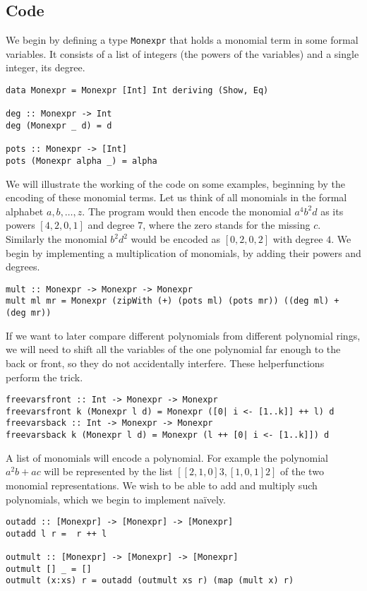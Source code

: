 \subsection*{Code}
We begin by defining a type \texttt{Monexpr} that holds a monomial term in some formal variables.
It consists of a list of integers (the powers of the variables) and a single integer, its degree.
\begin{lstlisting}
data Monexpr = Monexpr [Int] Int deriving (Show, Eq)
 
deg :: Monexpr -> Int
deg (Monexpr _ d) = d

pots :: Monexpr -> [Int]
pots (Monexpr alpha _) = alpha
\end{lstlisting}
We will illustrate the working of the code on some examples, beginning by the encoding of these monomial terms.
Let us think of all monomials in the formal alphabet $a,b,\dots,z$. 
The program would then encode the monomial $a^4b^2d$ as its powers $[4,2,0,1]$ and degree $7$, where the zero stands for the missing $c$. 
Similarly the monomial $b^2 d^2$ would be encoded as $[0,2,0,2]$ with degree $4$.
We begin by implementing a multiplication of monomials, by adding their powers and degrees.
\begin{lstlisting}
mult :: Monexpr -> Monexpr -> Monexpr
mult ml mr = Monexpr (zipWith (+) (pots ml) (pots mr)) ((deg ml) + (deg mr))
\end{lstlisting}
If we want to later compare different polynomials from different polynomial rings, we will need to shift all the variables of the one polynomial far enough to the back or front, so they do not accidentally interfere.
These helperfunctions perform the trick.
\begin{lstlisting}
freevarsfront :: Int -> Monexpr -> Monexpr
freevarsfront k (Monexpr l d) = Monexpr ([0| i <- [1..k]] ++ l) d
freevarsback :: Int -> Monexpr -> Monexpr
freevarsback k (Monexpr l d) = Monexpr (l ++ [0| i <- [1..k]]) d
\end{lstlisting}
A list of monomials will encode a polynomial. 
For example the polynomial $a^2b + a c$ will be represented by the list $[[2,1,0] 3, [1,0,1] 2]$ of the two monomial representations.
We wish to be able to add and multiply such polynomials, which we begin to implement na\"{i}vely.
\begin{lstlisting}
outadd :: [Monexpr] -> [Monexpr] -> [Monexpr]
outadd l r =  r ++ l

outmult :: [Monexpr] -> [Monexpr] -> [Monexpr]
outmult [] _ = []
outmult (x:xs) r = outadd (outmult xs r) (map (mult x) r)
\end{lstlisting}
